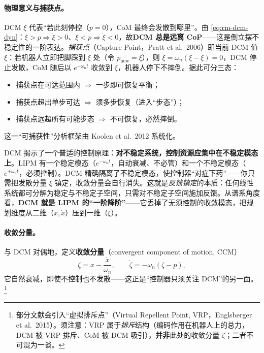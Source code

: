 \paragraph{物理意义与捕获点。}
DCM $\xi$ 代表“若此刻停控（$p=0$），CoM 最终会发散到哪里”。由 \cref{eq:rm-dcm-dyn}：$\xi>p\Rightarrow\dot{\xi}>0$、$\xi<p\Rightarrow\dot{\xi}<0$，故\textbf{DCM 总是远离 CoP}——这是倒立摆不稳定性的一阶表达。\emph{捕获点}（Capture Point，Pratt et al.\ 2006\cite{pratt2006capture}）即当前 DCM 值 $\xi$：若机器人立即把脚踩到 $\xi$ 处（令 $p_{\mathrm{new}}=\xi$），则 $\dot{\xi}=\omega_n(\xi-\xi)=0$，DCM 停止发散，CoM 随后以 $e^{-\omega_n t}$ 收敛到 $\xi$，机器人停下不摔倒。据此可分三态：
\begin{itemize}
  \item 捕获点在可达范围内 $\Rightarrow$ 一步即可恢复平衡；
  \item 捕获点超出单步可达 $\Rightarrow$ 须多步恢复（进入“步态”）；
  \item 捕获点远超所有可能步态 $\Rightarrow$ 不可恢复，必然摔倒。
\end{itemize}
这一“可捕获性”分析框架由 Koolen et al.\ 2012 系统化\cite{koolen2012capturability}。

\begin{insight}
DCM 揭示了一个普适的控制原理：\textbf{对不稳定系统，控制资源应集中在不稳定模态上}。LIPM 有一个稳定模态（$e^{-\omega_n t}$，自动衰减、不必管）和一个不稳定模态（$e^{+\omega_n t}$，必须控制）。DCM 精确隔离了不稳定模态，使控制器“对症下药”——你只需把发散分量 $\xi$ 镇定，收敛分量会自行消失。这就是\emph{反馈镇定}的本质：任何线性系统都可分解为稳定与不稳定子空间，只需对不稳定子空间施加反馈。从谱系角度看，\textbf{DCM 就是 LIPM 的“一阶降阶”}——它丢掉了无须控制的收敛模态，把规划维度从二维（$x,\dot{x}$）压到一维（$\xi$）。
\end{insight}

\paragraph{收敛分量。}
与 DCM 对偶地，定义\textbf{收敛分量}（convergent component of motion, CCM）
\begin{equation}
  \zeta=x-\frac{\dot{x}}{\omega_n},\qquad \dot{\zeta}=-\omega_n(\zeta-p),
  \label{eq:rm-ccm}
\end{equation}
它自然衰减，即使不控制也不发散——这正是“控制器只须关注 DCM”的另一面。\footnote{部分文献会引入“虚拟排斥点”（Virtual Repellent Point, VRP，Englsberger et al.\ 2015\cite{englsberger2015dcm}）。须注意：VRP 属于\emph{排斥}结构（编码作用在机器人上的总力，DCM 被 VRP 排斥、CoM 被 DCM 吸引），\textbf{并非}此处的收敛分量 $\zeta$；二者不可混为一谈。}

